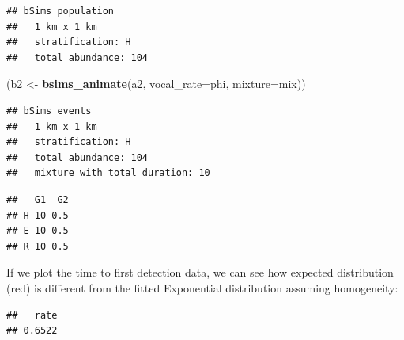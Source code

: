 \documentclass[12pt,]{book}
\newenvironment{Shaded}{\begin{snugshade}}{\end{snugshade}}
\newcommand{\DataTypeTok}[1]{\textcolor[rgb]{0.13,0.29,0.53}{#1}}
\newcommand{\KeywordTok}[1]{\textcolor[rgb]{0.13,0.29,0.53}{\textbf{#1}}}
\newcommand{\NormalTok}[1]{#1}
\newcommand{\OperatorTok}[1]{\textcolor[rgb]{0.81,0.36,0.00}{\textbf{#1}}}
\newcommand{\OtherTok}[1]{\textcolor[rgb]{0.56,0.35,0.01}{#1}}
\newcommand{\StringTok}[1]{\textcolor[rgb]{0.31,0.60,0.02}{#1}}
\begin{document}
\begin{verbatim}
## bSims population
##   1 km x 1 km
##   stratification: H
##   total abundance: 104
\end{verbatim}

\begin{Shaded}
\begin{Highlighting}[]
\NormalTok{(b2 <-}\StringTok{ }\KeywordTok{bsims_animate}\NormalTok{(a2, }\DataTypeTok{vocal_rate=}\NormalTok{phi, }\DataTypeTok{mixture=}\NormalTok{mix))}
\end{Highlighting}
\end{Shaded}

\begin{verbatim}
## bSims events
##   1 km x 1 km
##   stratification: H
##   total abundance: 104
##   mixture with total duration: 10
\end{verbatim}

\begin{Shaded}
\end{Shaded}

\begin{verbatim}
##   G1  G2
## H 10 0.5
## E 10 0.5
## R 10 0.5
\end{verbatim}

If we plot the time to first detection data, we can see how
expected distribution (red) is different from the fitted
Exponential distribution assuming homogeneity:

\begin{Shaded}
\end{Shaded}

\begin{verbatim}
##   rate 
## 0.6522
\end{verbatim}
\end{document}
